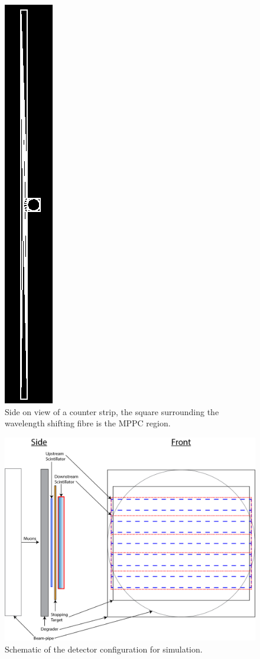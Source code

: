 \begin{figure}[hptb]
  \centering
    \includegraphics[scale=0.5, angle=90]{images/Geometry/full_strip.png}
  \caption{Side on view of a counter strip, the square surrounding the wavelength shifting fibre is the MPPC region. }
  \label{fig:images_Geometry_full_strip}
\end{figure}

\begin{figure}[hptb]
  \centering
    \includegraphics[width=.9\textwidth]{images/Detector_setup_music5.png}
  \caption{Schematic of the detector configuration for simulation.}
  \label{fig:images_Detector_setup_music5}
\end{figure}

